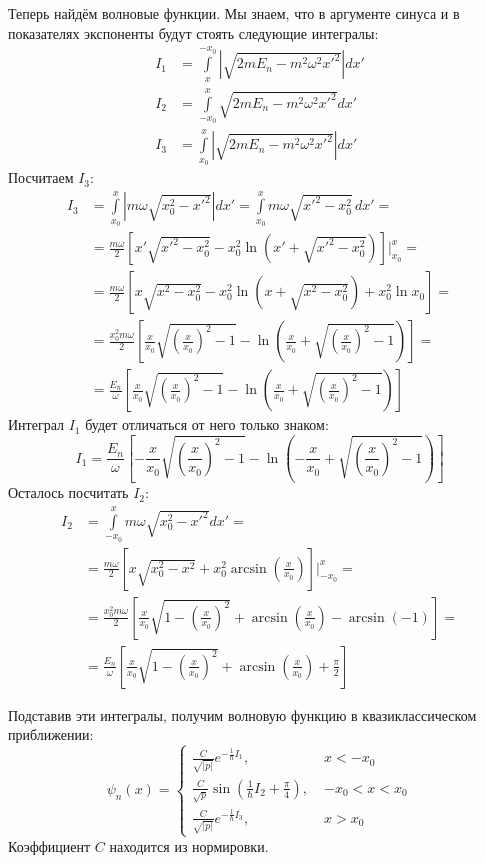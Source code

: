 Теперь найдём волновые функции. Мы знаем, что в аргументе синуса и в показателях экспоненты будут стоять следующие интегралы:
\begin{align*}
I_1 &= \int\limits_{x}^{-x_0}\left|\sqrt{2mE_n - m^2\omega^2x'^2}\right|dx'\\
I_2 &= \int\limits_{-x_0}^{x}\sqrt{2mE_n - m^2\omega^2x'^2}dx'\\
I_3 &= \int\limits_{x_0}^{x}\left|\sqrt{2mE_n - m^2\omega^2x'^2}\right|dx'
\end{align*}
Посчитаем $I_3$:
\begin{align*}
    I_3 &= \int\limits_{x_0}^{x}\left|m\omega\sqrt{x_0^2 - x'^2}\right|dx' = \int\limits_{x_0}^{x} m\omega\sqrt{x'^2 - x_0^2}\,dx' = \\
    &= \frac{m\omega}{2}\left[x'\sqrt{x'^2 - x_0^2} - x_0^2\ln (x' + \sqrt{x'^2 - x_0^2} )\right]\Bigg|_{x_0}^{x} = \\ 
    &= \frac{m\omega}{2}\left[x\sqrt{x^2 - x_0^2} - x_0^2\ln (x + \sqrt{x^2 - x_0^2} ) + x_0^2\ln x_0 \right]= \\
    &= \frac{x_0^2 m\omega}{2} \left[\frac{x}{x_0}\sqrt{\left(\frac{x}{x_0}\right)^2 - 1} - \ln (\frac{x}{x_0} + \sqrt{\left(\frac{x}{x_0}\right)^2 - 1} )\right] = \\
    &=\frac{E_n} {\omega}\left[\frac{x}{x_0}\sqrt{\left(\frac{x}{x_0}\right)^2 - 1} - \ln (\frac{x}{x_0} + \sqrt{ \left(\frac{x}{x_0}\right)^2 - 1} )\right]
\end{align*}
Интеграл $I_1$ будет отличаться от него только знаком:
\[
    I_1 = \frac{E_n}{\omega}\left[-\frac{x}{x_0}\sqrt{\left(\frac{x}{x_0}\right)^2 - 1} - \ln (-\frac{x}{x_0} + \sqrt{ \left(\frac{x}{x_0}\right)^2 - 1} )\right]
\]
Осталось посчитать $I_2$:
\begin{align*}
    I_2 &= \int\limits_{-x_0}^{x}m\omega\sqrt{x_0^2 - x'^2}dx' = \\
    & = \frac{m\omega}{2}\left[x\sqrt{x_0^2- x^2} + x_0^2\arcsin\left(\frac{x}{x_0}\right)\right]\Bigg|_{-x_0}^{x} = \\
    & = \frac{x_0^2 m\omega}{2}\left[\frac{x}{x_0}\sqrt{1 - \left(\frac{x}{x_0}\right)^2 } + \arcsin\left(\frac{x}{x_0}\right) - \arcsin(-1)\right] = \\
    & = \frac{E_n}{\omega}\left[\frac{x}{x_0}\sqrt{1 - \left(\frac{x}{x_0}\right)^2} + \arcsin(\frac{x}{x_0}) + \frac{\pi}{2}\right]
\end{align*}


Подставив эти интегралы, получим волновую функцию в квазиклассическом приближении:
\begin{equation*}
\psi_n(x) = 
\begin{cases}
    \frac{C}{\sqrt{|p|}}e^{-\frac{1}{\hbar}I_1},\; &x < -x_0\\
    \frac{C}{\sqrt{p}}\sin(\frac{1}{\hbar}I_2 + \frac{\pi}{4}),\; &-x_0 < x < x_0\\
    \frac{C}{\sqrt{|p|}}e^{-\frac{1}{\hbar}I_3},\; &x > x_0
\end{cases}
\end{equation*}
Коэффициент $C$ находится из нормировки.

